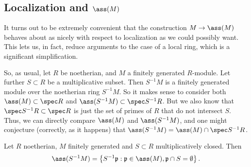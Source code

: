 \subsection{Localization and $\ass(M)$}

It turns out to be extremely convenient that the construction $M  \to \ass(M)$
behaves about as nicely with respect to localization as we could possibly
want. This lets us, in fact, reduce arguments to the case of a local ring,
which is a significant simplification.

So, as usual, let $R $ be noetherian, and $M$ a finitely generated $R$-module. 
Let further $S \subset R$ be a multiplicative subset. 
Then $S^{-1}M$ is a finitely generated module over the noetherian ring
$S^{-1}M$. So it makes sense to consider both $\ass(M) \subset \spec R$ and
$\ass(S^{-1}M) \subset \spec S^{-1}R$. But we also know that $\spec S^{-1}R
\subset \spec R$ is just the set of primes of $R$ that do not intersect $S$.
Thus, we can directly compare $\ass(M)$ and $\ass(S^{-1}M)$, and one might
conjecture (correctly, as it happens) that $\ass(S^{-1}M) = \ass(M) \cap \spec
S^{-1}R$.
\begin{proposition} \label{assmlocalization}
Let $R$ noetherian, $M$ finitely generated and $S \subset R$ multiplicatively closed. 
Then 
\[ \ass(S^{-1}M)  = \left\{S^{-1}\mathfrak{p}: \mathfrak{p} \in \ass(M),
\mathfrak{p}\cap S  = \emptyset \right\} . \]
\end{proposition} 

